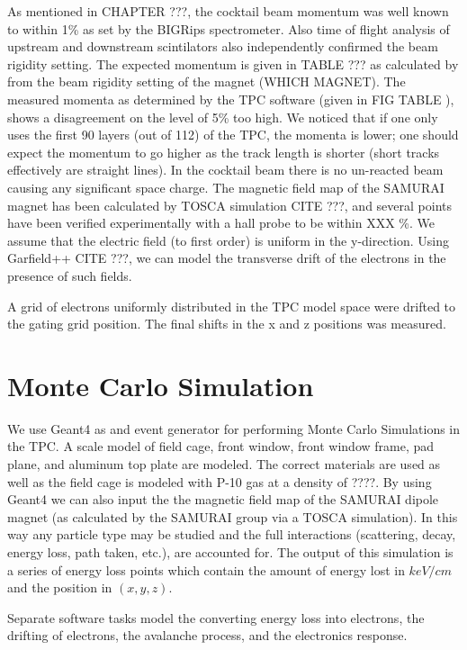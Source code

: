 As mentioned in CHAPTER ???, the cocktail beam momentum was well known to within 1\% as set by the BIGRips spectrometer. Also time of flight analysis of upstream and downstream scintilators also independently confirmed the beam rigidity setting. The expected momentum is given in TABLE ??? as calculated by from the beam rigidity setting of the magnet (WHICH MAGNET). The measured momenta as determined by the TPC software (given in FIG TABLE ), shows a disagreement on the level of 5\% too high. We noticed that if one only uses the first 90 layers (out of 112) of the TPC, the momenta is lower; one should expect the momentum to go higher as the track length is shorter (short tracks effectively are straight lines). 
In the cocktail beam there is no un-reacted beam causing any significant space charge. The magnetic field map of the SAMURAI magnet has been calculated by TOSCA simulation CITE ???, and several points have been verified experimentally with a hall probe to be within XXX \%. We assume that the electric field (to first order) is uniform in the y-direction. Using Garfield++ CITE ???, we can model the transverse drift of the electrons in the presence of such fields. 

A grid of electrons uniformly distributed in the TPC model space were drifted to the gating grid position. The final shifts in the x and z positions was measured. 


\section{Monte Carlo Simulation}
We use Geant4 as and event generator for performing Monte Carlo Simulations in the TPC. A scale model of field cage, front window, front window frame, pad plane, and aluminum top plate are modeled. The correct materials are used as well as the field cage is modeled with P-10 gas at a density of ????. By using Geant4 we can also input the the magnetic field map of the SAMURAI dipole magnet (as calculated by the SAMURAI group via a TOSCA simulation).  In this way any particle type may be studied and the full interactions (scattering, decay, energy loss, path taken, etc.), are accounted for. The output of this simulation is a series of energy loss points which contain the amount of energy lost in $keV/cm$ and the position in $(x,y,z)$.

Separate software tasks model the converting energy loss into electrons, the drifting of electrons, the avalanche process, and the electronics response.

